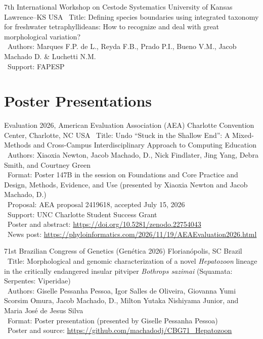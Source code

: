 \documentclass[11pt, letterpaper, sans]{moderncv}
\begin{document}
\cventry{---}
	{7th International Workshop on Cestode Systematics}
	{University of Kansas}
	{Lawrence--KS}
	{USA}
	{
		\textbullet~Title: Defining species boundaries using integrated taxonomy for freshwater tetraphyllideans: How to recognize and deal with great morphological variation?\\
		\textbullet~Authors: Marques F.P. de L., Reyda F.B., Prado P.I., Bueno V.M., Jacob Machado D. \& Luchetti N.M.\\
		\textbullet~Support: FAPESP
	}


\section{Poster Presentations}

    {Evaluation 2026, American Evaluation Association (AEA)}
    {Charlotte Convention Center, Charlotte, NC}
    {USA}
    {}
    {
        \textbullet~Title: Undo ``Stuck in the Shallow End'': A Mixed-Methods and Cross-Campus Interdisciplinary Approach to Computing Education\\
        \textbullet~Authors: Xiaoxia Newton, Jacob Machado, D., Nick Findlater, Jing Yang, Debra Smith, and Courtney Green\\
        \textbullet~Format: Poster 147B in the session on Foundations and Core Practice and Design, Methods, Evidence, and Use (presented by Xiaoxia Newton and Jacob Machado, D.)\\
        \textbullet~Proposal: AEA proposal 2419618, accepted July 15, 2026\\
        \textbullet~Support: UNC Charlotte Student Success Grant\\
        \textbullet~Poster and abstract: \url{https://doi.org/10.5281/zenodo.22754043}\\
        \textbullet~News post: \url{https://phyloinformatics.com/2026/11/19/AEAEvaluation2026.html}
    }

    {71st Brazilian Congress of Genetics (Genética 2026)}
    {Florianópolis, SC}
    {Brazil}
    {}
    {
        \textbullet~Title: Morphological and genomic characterization of a novel \textit{Hepatozoon} lineage in the critically endangered insular pitviper \textit{Bothrops sazimai} (Squamata: Serpentes: Viperidae)\\
        \textbullet~Authors: Giselle Pessanha Pessoa, Igor Salles de Oliveira, Giovanna Yumi Scorsim Omura, Jacob Machado, D., Milton Yutaka Nishiyama Junior, and Maria José de Jesus Silva\\
        \textbullet~Format: Poster presentation (presented by Giselle Pessanha Pessoa)\\
        \textbullet~Poster and source: \url{https://github.com/machadodj/CBG71_Hepatozoon}
    }
\end{document}
